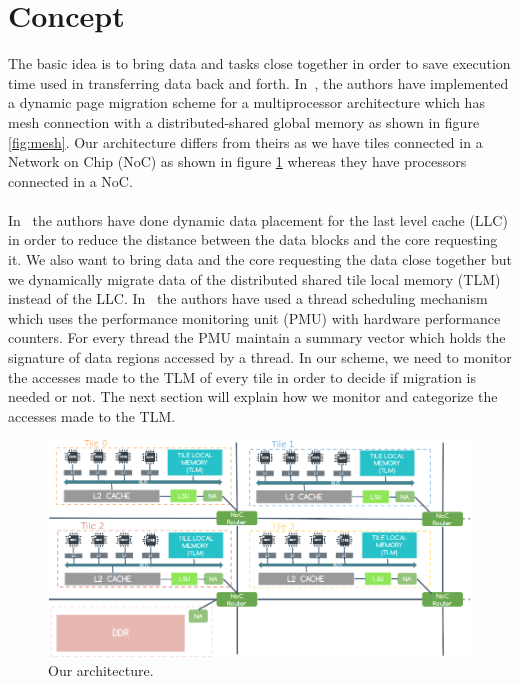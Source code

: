 \documentclass{listhesis}
\begin{document}
\section{Concept}
The basic idea is to bring data and tasks close together in order to save execution time used in transferring data back and forth. In~\cite{dynamicPageMigration}, the authors have implemented a dynamic page migration scheme for a multiprocessor architecture which has mesh connection with a distributed-shared global memory as shown in figure \ref{fig:mesh}. Our architecture differs from theirs as we have tiles connected in a Network on Chip (NoC) as shown in figure \ref{fig:processor} whereas they have processors connected in a NoC.\\
\\
In~\cite{cacheDataPlacement1, cacheDataPlacement3, cacheDataPlacement4} the authors have done dynamic data placement for the last level cache (LLC) in order to reduce the distance between the data blocks and the core requesting it. We also want to bring data and the core requesting the data close together but we dynamically migrate data of the distributed shared tile local memory (TLM) instead of the LLC. In~\cite{threadPlacement4} the authors have used a thread scheduling mechanism which uses the performance monitoring unit (PMU) with hardware performance counters. For every thread the PMU maintain a summary vector which holds the signature of data regions accessed by a thread. In our scheme, we need to monitor the accesses made to the TLM of every tile in order to decide if migration is needed or not. The next section will explain how we monitor and categorize the accesses made to the TLM. \\
\begin{figure}
  \includegraphics[width=\linewidth]{processor.png}
  \centering
  \caption{Our architecture.}
  \label{fig:processor}
\end{figure}
\end{document}
